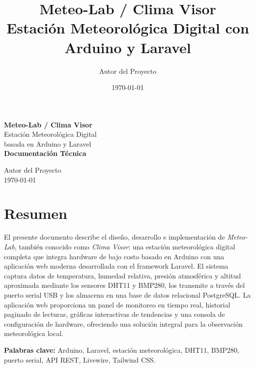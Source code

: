 \documentclass[12pt,a4paper]{report}
\title{\textbf{Meteo-Lab / Clima Visor}\\[0.5em]
\Large Estación Meteorológica Digital con Arduino y Laravel}
\author{Autor del Proyecto}
\date{\today}
\begin{document}
\begin{titlepage}
    \centering
    \vspace*{2cm}
    
    {\Huge\bfseries Meteo-Lab / Clima Visor}\\[1cm]
    {\LARGE Estación Meteorológica Digital}\\[0.3cm]
    {\LARGE basada en Arduino y Laravel}\\[2cm]
    
    
    {\large\textbf{Documentación Técnica}}\\[1.5cm]
    
    \vfill
    
    {\large Autor del Proyecto}\\[0.5cm]
    {\large \today}
    
\end{titlepage}

\chapter*{Resumen}

El presente documento describe el diseño, desarrollo e implementación de \textit{Meteo-Lab}, también conocido como \textit{Clima Visor}: una estación meteorológica digital completa que integra hardware de bajo costo basado en Arduino con una aplicación web moderna desarrollada con el framework Laravel. El sistema captura datos de temperatura, humedad relativa, presión atmosférica y altitud aproximada mediante los sensores DHT11 y BMP280, los transmite a través del puerto serial USB y los almacena en una base de datos relacional PostgreSQL. La aplicación web proporciona un panel de monitoreo en tiempo real, historial paginado de lecturas, gráficas interactivas de tendencias y una consola de configuración de hardware, ofreciendo una solución integral para la observación meteorológica local.

\textbf{Palabras clave:} Arduino, Laravel, estación meteorológica, DHT11, BMP280, puerto serial, API REST, Livewire, Tailwind CSS.
\end{document}
